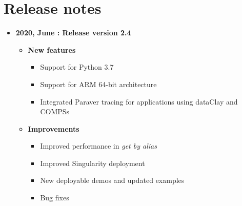 \chapter*{Release notes}

\begin{itemize}
\item[] \textbf{2020, June : Release version 2.4}\newline
    \begin{itemize}
    \item[] \textbf{New features}
        \begin{itemize}
            \item[] Support for Python 3.7
            \item[] Support for ARM 64-bit architecture
            \item[] Integrated Paraver tracing for applications using dataClay and COMPSs
        \end{itemize}
    \item[] \textbf{Improvements}
        \begin{itemize}
            \item[] Improved performance in \textit{get by alias}
            \item[] Improved Singularity deployment
            \item[] New deployable demos and updated examples
            \item[] Bug fixes
        \end{itemize}
    \end{itemize}
\end{itemize}
